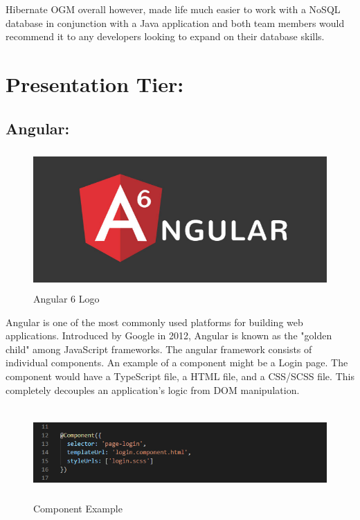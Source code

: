\bigskip

Hibernate OGM overall however, made life much easier to work with a NoSQL database in conjunction with a Java application and both team members would recommend it to any developers looking to expand on their database skills.


\section{Presentation Tier:}
\label{sec:TechnologyReviewPresentationTier}
\subsection{Angular:}
\label{sec:TechnologyReviewAngular}

\begin{figure}[H]
    \centering
    \includegraphics[width=\textwidth, height=150pt]{img/Angular6Logo.PNG}
    \caption{Angular 6 Logo}
    \label{fig:my_label}
\end{figure}

\bigskip

Angular is one of the most commonly used platforms for building web applications. Introduced by Google in 2012, Angular is known as the "golden child" among JavaScript frameworks. The angular framework consists of individual components. An example of a component might be a Login page. The component would have a TypeScript file, a HTML file, and a CSS/SCSS file. This completely decouples an application's logic from DOM manipulation.

\bigskip

\begin{figure}[H]
    \centering
    \includegraphics[width=\textwidth, height=100pt]{img/LoginComponent.PNG}
    \caption{Component Example}
    \label{fig:my_label}
\end{figure}

